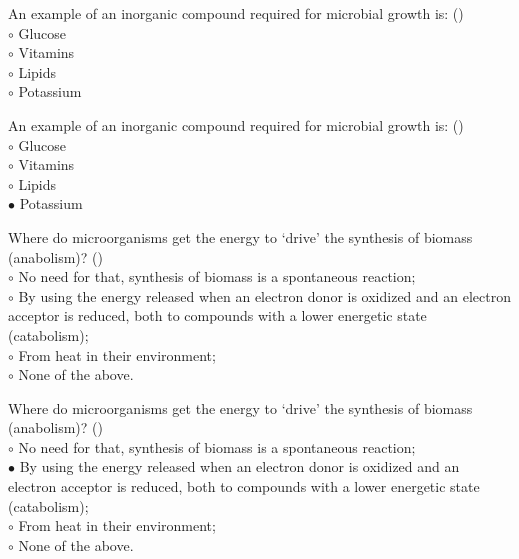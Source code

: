 \documentclass[]{beamer}
\begin{document}
\begin{frame}[shrink] {}
\addtocounter{questions}{1}
\color{blue}
An example of an inorganic compound required for microbial growth is:  ()\\
\color{black}
\setlength{\parindent}{-0.4cm}
{\color{red}$\circ$}  Glucose\\
{\color{red}$\circ$} Vitamins\\
{\color{red}$\circ$} Lipids\\
{\color{red}$\circ$} Potassium \\
\end{frame}
\begin{frame}[shrink] {}
\addtocounter{answers}{1}
\color{blue}
An example of an inorganic compound required for microbial growth is:  ()\\
\color{black}
\setlength{\parindent}{-0.4cm}
{\color{red}$\circ$}  Glucose\\
{\color{red}$\circ$} Vitamins\\
{\color{red}$\circ$} Lipids\\
{\color{red}$\bullet$} Potassium \\
\end{frame}

\begin{frame}[shrink] {}
\addtocounter{questions}{1}
\color{blue}
Where do microorganisms get the energy to ‘drive’ the synthesis of biomass (anabolism)?  ()\\
\color{black}
\setlength{\parindent}{-0.4cm}
{\color{red}$\circ$}  No need for that, synthesis of biomass is a spontaneous reaction;\\
{\color{red}$\circ$} By using the energy released when an electron donor is oxidized and an electron acceptor is reduced, both to compounds with a lower energetic state (catabolism);\\
{\color{red}$\circ$} From heat in their environment;\\
{\color{red}$\circ$} None of the above. \\
\end{frame}
\begin{frame}[shrink] {}
\addtocounter{answers}{1}
\color{blue}
Where do microorganisms get the energy to ‘drive’ the synthesis of biomass (anabolism)?  ()\\
\color{black}
\setlength{\parindent}{-0.4cm}
{\color{red}$\circ$}  No need for that, synthesis of biomass is a spontaneous reaction;\\
{\color{red}$\bullet$} By using the energy released when an electron donor is oxidized and an electron acceptor is reduced, both to compounds with a lower energetic state (catabolism);\\
{\color{red}$\circ$} From heat in their environment;\\
{\color{red}$\circ$} None of the above. \\
\end{frame}
\end{document}

